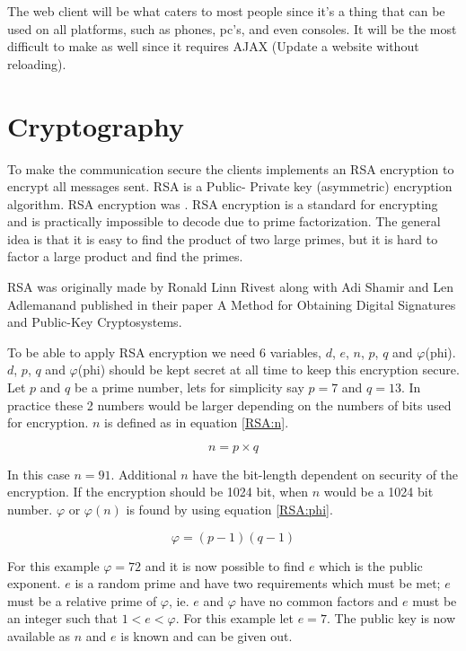 The web client will be what caters to most people since it's a thing that can be used on all platforms, such as phones, pc's, and even consoles. It will be the most difficult to make as well since it requires AJAX (Update a website without reloading).

\section{Cryptography}

To make the communication secure the clients implements an RSA encryption to encrypt all messages sent. RSA is a Public- Private key (asymmetric) encryption algorithm. RSA encryption was . RSA encryption is a standard for encrypting and is practically impossible to decode due to prime factorization. The general idea is that it is easy to find the product of two large primes, but it is hard to factor a large product and find the primes.

RSA was originally made by Ronald Linn Rivest along with Adi Shamir and Len Adlemanand published in their paper A Method for Obtaining Digital Signatures and Public-Key Cryptosystems\cite{RSA}.

To be able to apply RSA encryption we need 6 variables, $d$, $e$, $n$, $p$, $q$ and $\varphi$(phi). $d$, $p$, $q$ and $\varphi$(phi) should be kept secret at all time to keep this encryption secure. Let $p$ and $q$ be a prime number, lets for simplicity say $p=7$ and $q=13$. In practice these 2 numbers would be larger depending on the numbers of bits used for encryption. $n$ is defined as in equation \ref{RSA:n}.

\begin{equation}
n = p \times q
\label{RSA:n}
\end{equation}

In this case $n=91$. Additional $n$ have the bit-length dependent on security of the encryption. If the encryption should be 1024 bit, when $n$ would be a 1024 bit number. $\varphi$ or $\varphi(n)$ is found by using equation \ref{RSA:phi}.

\begin{equation}
\varphi = (p-1)(q-1)
\label{RSA:phi}
\end{equation}

For this example $\varphi = 72$ and it is now possible to find $e$ which is the public exponent. $e$ is a random prime and have two requirements which must be met; $e$ must be a relative prime of $\varphi$, ie. $e$ and $\varphi$ have no common factors and $e$ must be an integer such that $1 < e < \varphi$. For this example let $e=7$. The public key is now available as $n$ and $e$ is known and can be given out.

